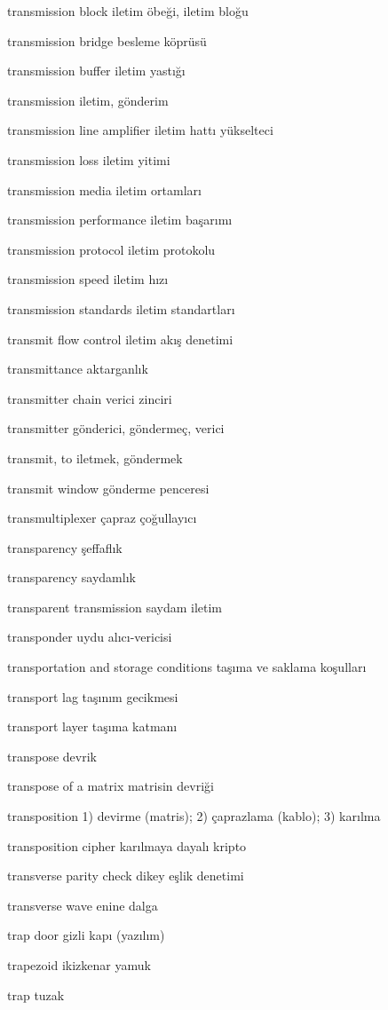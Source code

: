 \documentclass[12pt,fleqn]{article}\usepackage{../../common}
\begin{document}
transmission block iletim öbeği, iletim bloğu

transmission bridge besleme köprüsü

transmission buffer iletim yastığı

transmission iletim, gönderim

transmission line amplifier iletim hattı yükselteci

transmission loss iletim yitimi

transmission media iletim ortamları

transmission performance iletim başarımı

transmission protocol iletim protokolu

transmission speed iletim hızı

transmission standards iletim standartları

transmit flow control iletim akış denetimi

transmittance aktarganlık

transmitter chain verici zinciri

transmitter gönderici, göndermeç, verici

transmit, to iletmek, göndermek

transmit window gönderme penceresi

transmultiplexer çapraz çoğullayıcı

transparency şeffaflık

transparency saydamlık

transparent transmission saydam iletim

transponder uydu alıcı-vericisi

transportation and storage conditions taşıma ve saklama koşulları

transport lag taşınım gecikmesi

transport layer taşıma katmanı

transpose devrik

transpose of a matrix matrisin devriği

transposition 1) devirme (matris); 2) çaprazlama (kablo); 3) karılma

transposition cipher karılmaya dayalı kripto

transverse parity check dikey eşlik denetimi

transverse wave enine dalga

trap door gizli kapı (yazılım)

trapezoid ikizkenar yamuk

trap tuzak
\end{document}
